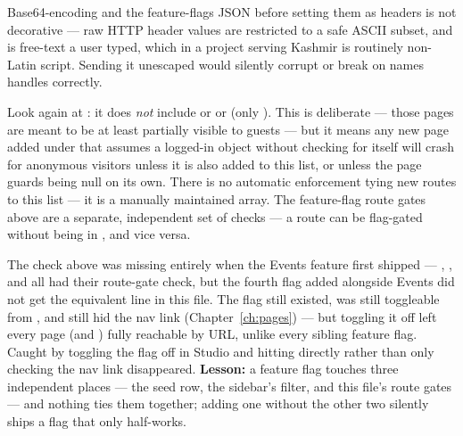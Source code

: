 \begin{olknote}
Base64-encoding  and the feature-flags JSON before setting them as headers is not decorative — raw HTTP header values are restricted to a safe ASCII subset, and  is free-text a user typed, which in a project serving Kashmir is routinely non-Latin script. Sending it unescaped would silently corrupt or break on names  handles correctly.
\end{olknote}

\begin{olknote}
Look again at : it does \emph{not} include  or  or  (only ). This is deliberate — those pages are meant to be at least partially visible to guests — but it means any new page added under  that assumes a logged-in  object without checking for  itself will crash for anonymous visitors unless it is also added to this list, or unless the page guards  being null on its own. There is no automatic enforcement tying new routes to this list — it is a manually maintained array. The feature-flag route gates above are a separate, independent set of checks — a route can be flag-gated without being in , and vice versa.
\end{olknote}

\begin{olkgotcha}
The  check above was missing entirely when the Events feature first shipped — , , and  all had their route-gate check, but the fourth flag added alongside Events did not get the equivalent line in this file. The flag still existed, was still toggleable from , and still hid the nav link (Chapter~\ref{ch:pages}) — but toggling it off left every  page (and ) fully reachable by URL, unlike every sibling feature flag. Caught by toggling the flag off in Studio and hitting  directly rather than only checking the nav link disappeared. \textbf{Lesson:} a feature flag touches three independent places — the seed row, the sidebar's  filter, and this file's route gates — and nothing ties them together; adding one without the other two silently ships a flag that only half-works.
\end{olkgotcha}

